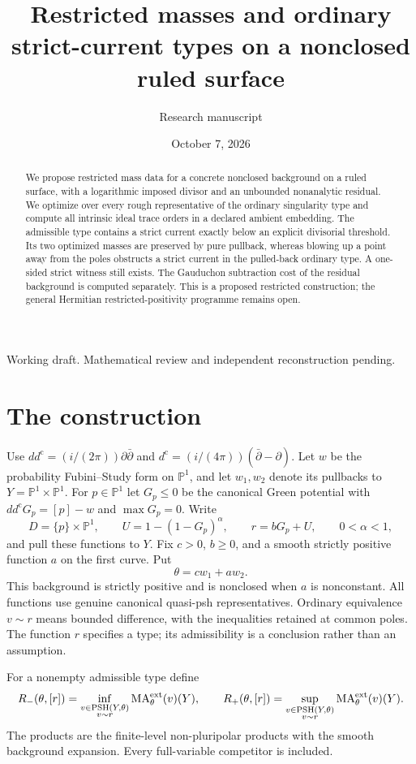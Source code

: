 \documentclass[11pt]{article}
\title{Restricted masses and ordinary strict-current types\newline
on a nonclosed ruled surface}
\author{Research manuscript}
\date{October 7, 2026}
\theoremstyle{remark}
\newcommand{\ddc}{dd^{\mathrm c}}
\newcommand{\dc}{d^{\mathrm c}}
\newcommand{\PSH}{\operatorname{PSH}}
\newcommand{\MA}{\operatorname{MA}}
\newcommand{\PP}{\mathbb P}
\begin{document}
\maketitle
\begin{center}
\small Working draft. Mathematical review and independent reconstruction pending.
\end{center}
\begin{abstract}
We propose restricted mass data for a concrete nonclosed background on a
ruled surface, with a logarithmic imposed divisor and an unbounded
nonanalytic residual. We optimize over every rough representative of the
ordinary singularity type and compute all intrinsic ideal trace orders in
a declared ambient embedding. The admissible type contains a strict current
exactly below an explicit divisorial threshold. Its two optimized masses
are preserved by pure pullback, whereas blowing up a point away from the
poles obstructs a strict current in the pulled-back ordinary type. A
one-sided strict witness still exists. The Gauduchon subtraction cost of
the residual background is computed separately. This is a proposed
restricted construction; the general Hermitian restricted-positivity
programme remains open.
\end{abstract}

\section{The construction}
Use $\ddc=(i/(2\pi))\partial\bar\partial$ and
$\dc=(i/(4\pi))(\bar\partial-\partial)$. Let $w$ be the probability
Fubini--Study form on $\PP^1$, and let $w_1,w_2$ denote its pullbacks to
$Y=\PP^1\times\PP^1$. For $p\in\PP^1$ let $G_p\leq0$ be the canonical
Green potential with $\ddc G_p=[p]-w$ and $\max G_p=0$. Write
\[
 D=\{p\}\times\PP^1,\qquad
 U=1-(1-G_p)^\alpha,\qquad
 r=bG_p+U,\qquad 0<\alpha<1,
\]
and pull these functions to $Y$. Fix $c>0$, $b\geq0$, and a smooth
strictly positive function $a$ on the first curve. Put
\[
 \theta=cw_1+aw_2.
\]
This background is strictly positive and is nonclosed when $a$ is
nonconstant. All functions use genuine canonical quasi-psh representatives.
Ordinary equivalence $v\sim r$ means bounded difference, with the
inequalities retained at common poles. The function $r$ specifies a type;
its admissibility is a conclusion rather than an assumption.

For a nonempty admissible type define
\[
 R_-(\theta,[r])=\inf_{\substack{v\in\PSH(Y,\theta)\\v\sim r}}
                   \MA^{\rm ext}_\theta(v)(Y),\qquad
 R_+(\theta,[r])=\sup_{\substack{v\in\PSH(Y,\theta)\\v\sim r}}
                   \MA^{\rm ext}_\theta(v)(Y).
\]
The products are the finite-level non-pluripolar products with the smooth
background expansion. Every full-variable competitor is included.
\end{document}
